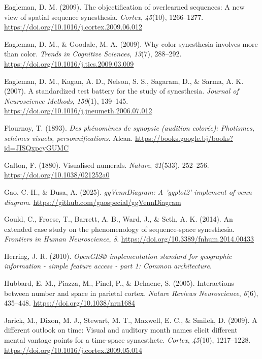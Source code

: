 \documentclass[
  man,
  floatsintext,
  longtable,
  a4paper,
  nolmodern,
  notxfonts,
  notimes,
  colorlinks=true,linkcolor=blue,citecolor=blue,urlcolor=blue]{apa7}
\newlength{\cslhangindent}
\newenvironment{CSLReferences}[2] %
 {\begin{list}{}{%
  \setlength{\itemindent}{0pt}
  \setlength{\leftmargin}{0pt}
  \setlength{\parsep}{0pt}
  \ifodd #1
   \setlength{\leftmargin}{\cslhangindent}
   \setlength{\itemindent}{-1\cslhangindent}
  \fi
  \setlength{\itemsep}{#2\baselineskip}}}
 {\end{list}}
\begin{document}
\begin{CSLReferences}{1}{0}
Eagleman, D. M. (2009). The objectification of overlearned sequences: A
new view of spatial sequence synesthesia. \emph{Cortex}, \emph{45}(10),
1266--1277. \url{https://doi.org/10.1016/j.cortex.2009.06.012}

Eagleman, D. M., \& Goodale, M. A. (2009). Why color synesthesia
involves more than color. \emph{Trends in Cognitive Sciences},
\emph{13}(7), 288--292. \url{https://doi.org/10.1016/j.tics.2009.03.009}

Eagleman, D. M., Kagan, A. D., Nelson, S. S., Sagaram, D., \& Sarma, A.
K. (2007). A standardized test battery for the study of synesthesia.
\emph{Journal of Neuroscience Methods}, \emph{159}(1), 139--145.
\url{https://doi.org/10.1016/j.jneumeth.2006.07.012}

Flournoy, T. (1893). \emph{Des phénomènes de synopsie (audition
colorée): Photismes, schèmes visuels, personnifications}. Alcan.
\url{https://books.google.bj/books?id=JISQxpcyGUMC}

Galton, F. (1880). Visualised numerals. \emph{Nature}, \emph{21}(533),
252--256. \url{https://doi.org/10.1038/021252a0}

Gao, C.-H., \& Dusa, A. (2025). \emph{{ggVennDiagram}: A 'ggplot2'
implement of venn diagram}.
\url{https://github.com/gaospecial/ggVennDiagram}

Gould, C., Froese, T., Barrett, A. B., Ward, J., \& Seth, A. K. (2014).
An extended case study on the phenomenology of sequence-space
synesthesia. \emph{Frontiers in Human Neuroscience}, \emph{8}.
\url{https://doi.org/10.3389/fnhum.2014.00433}

Herring, J. R. (2010). \emph{OpenGIS® implementation standard for
geographic information - simple feature access - part 1: Common
architecture}.

Hubbard, E. M., Piazza, M., Pinel, P., \& Dehaene, S. (2005).
Interactions between number and space in parietal cortex. \emph{Nature
Reviews Neuroscience}, \emph{6}(6), 435--448.
\url{https://doi.org/10.1038/nrn1684}

Jarick, M., Dixon, M. J., Stewart, M. T., Maxwell, E. C., \& Smilek, D.
(2009). A different outlook on time: Visual and auditory month names
elicit different mental vantage points for a time-space synaesthete.
\emph{Cortex}, \emph{45}(10), 1217--1228.
\url{https://doi.org/10.1016/j.cortex.2009.05.014}


\end{CSLReferences}
\end{document}
